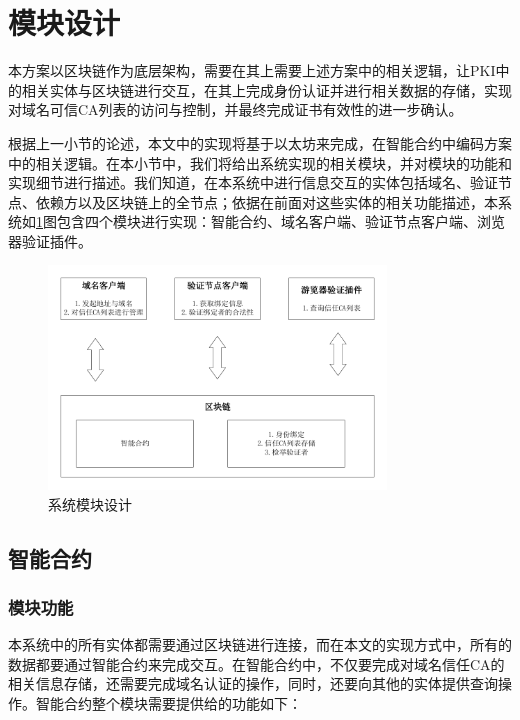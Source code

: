 \section{模块设计}



本方案以区块链作为底层架构，需要在其上需要上述方案中的相关逻辑，让PKI中的相关实体与区块链进行交互，在其上完成身份认证并进行相关数据的存储，实现对域名可信CA列表的访问与控制，并最终完成证书有效性的进一步确认。

根据上一小节的论述，本文中的实现将基于以太坊来完成，在智能合约中编码方案中的相关逻辑。在本小节中，我们将给出系统实现的相关模块，并对模块的功能和实现细节进行描述。我们知道，在本系统中进行信息交互的实体包括域名、验证节点、依赖方以及区块链上的全节点；依据在前面对这些实体的相关功能描述，本系统如\ref{fig:module}图包含四个模块进行实现：智能合约、域名客户端、验证节点客户端、浏览器验证插件。

\begin{figure}[htbp]
 	\centering
 	\includegraphics[width = 0.8\textwidth]{img/module}
 	\caption{系统模块设计}\label{fig:module}
\end{figure}


\subsection{智能合约}

\subsubsection{模块功能}

本系统中的所有实体都需要通过区块链进行连接，而在本文的实现方式中，所有的数据都要通过智能合约来完成交互。在智能合约中，不仅要完成对域名信任CA的相关信息存储，还需要完成域名认证的操作，同时，还要向其他的实体提供查询操作。智能合约整个模块需要提供给的功能如下：


